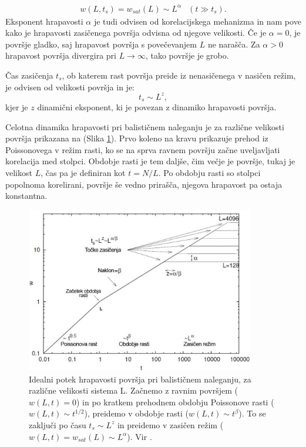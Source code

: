 \documentclass[a4paper, twoside, 12pt]{book}
\begin{document}
  \begin{equation}
    \begin{array}{lr} w(L,t_s) = w_{sat}(L) \sim L^\alpha & (t \gg t_s). \end{array}
    \label{alfa}
  \end{equation}
Eksponent hrapavosti $\alpha$ je tudi odvisen od korelacijskega mehanizma in nam pove kako je hrapavosti zasičenega površja odvisna od njegove velikosti. Če je $\alpha = 0$, je površje gladko, saj hrapavost površja s povečevanjem $L$ ne narašča. Za $\alpha > 0$ hrapavost površja divergira pri $L \rightarrow \infty$, tako površje je grobo. \cite{krim1993roughness}

Čas zasičenja $t_s$, ob katerem rast površja preide iz nenasičenega v nasičen režim, je odvisen od velikosti površja in je:
  \begin{equation}
    t_s \sim L^z,
    \label{z}
  \end{equation}
kjer je $z$ dinamični eksponent, ki je povezan z dinamiko hrapavosti površja.

Celotna dinamika hrapavosti pri balističnem naleganju je za različne velikosti površja prikazana na (Slika \ref{fig:barabasi}). Prvo koleno na kravu prikazuje prehod iz Poissonovega v režim rasti, ko se na sprva ravnem površju začne uveljavljati korelacija med stolpci. Obdobje rasti je tem daljše, čim večje je površje, tukaj je velikost $L$, čas pa je definiran kot $t=N/L$. Po obdobju rasti so stolpci popolnoma korelirani, površje še vedno prirašča, njegova hrapavost pa ostaja konstantna.

    \begin{figure}[h]
      \begin{center}
        \includegraphics[width=10cm]{slike/bdep3}
      \end{center}
      \caption{Idealni potek hrapavosti površja pri balističnem naleganju, za različne velikosti sistema L. Začnemo z ravnim površjem ($w(L,t)=0$) in po kratkem prehodnem obdobju Poissonove rasti ($w(L,t) \sim t^{1/2}$), preidemo v obdobje rasti ($w(L,t) \sim t^{\beta}$). To se zaključi po času $t_s \sim L^z$ in preidemo v zasičen režim ($w(L,t) = w_{sat}(L) \sim L^{\alpha}$). Vir \cite{schwettmann2003}.}
      \label{fig:barabasi}
    \end{figure}
\end{document}
